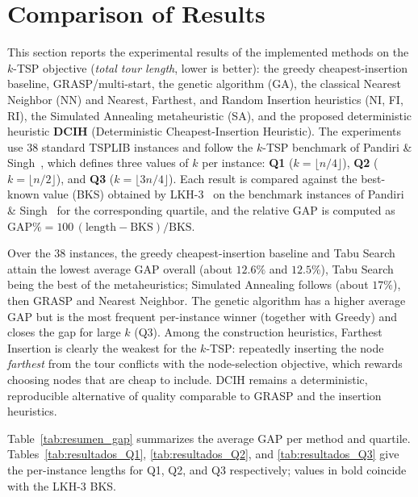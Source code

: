 \documentclass[conference]{IEEEtran}
\begin{document}
\section{Comparison of Results}
This section reports the experimental results of the implemented methods on the $k$-TSP objective (\emph{total tour length}, lower is better): the greedy cheapest-insertion baseline, GRASP/multi-start, the genetic algorithm (GA), the classical Nearest Neighbor (NN) and Nearest, Farthest, and Random Insertion heuristics (NI, FI, RI), the Simulated Annealing metaheuristic (SA), and the proposed deterministic heuristic \textbf{DCIH} (Deterministic Cheapest-Insertion Heuristic). The experiments use 38 standard TSPLIB instances and follow the $k$-TSP benchmark of Pandiri \& Singh~\cite{pandiri2020}, which defines three values of $k$ per instance: \textbf{Q1} ($k=\lfloor n/4\rfloor$), \textbf{Q2} ($k=\lfloor n/2\rfloor$), and \textbf{Q3} ($k=\lfloor 3n/4\rfloor$). Each result is compared against the best-known value (BKS) obtained by LKH-3~\cite{Helsgaun} on the benchmark instances of Pandiri \& Singh~\cite{pandiri2020} for the corresponding quartile, and the relative GAP is computed as $\mathrm{GAP}\%=100\,(\text{length}-\text{BKS})/\text{BKS}$.

Over the 38 instances, the greedy cheapest-insertion baseline and Tabu Search attain the lowest average GAP overall (about $12.6\%$ and $12.5\%$), Tabu Search being the best of the metaheuristics; Simulated Annealing follows (about $17\%$), then GRASP and Nearest Neighbor. The genetic algorithm has a higher average GAP but is the most frequent per-instance winner (together with Greedy) and closes the gap for large $k$ (Q3). Among the construction heuristics, Farthest Insertion is clearly the weakest for the $k$-TSP: repeatedly inserting the node \emph{farthest} from the tour conflicts with the node-selection objective, which rewards choosing nodes that are cheap to include. DCIH remains a deterministic, reproducible alternative of quality comparable to GRASP and the insertion heuristics.

Table~\ref{tab:resumen_gap} summarizes the average GAP per method and quartile. Tables~\ref{tab:resultados_Q1}, \ref{tab:resultados_Q2}, and \ref{tab:resultados_Q3} give the per-instance lengths for Q1, Q2, and Q3 respectively; values in bold coincide with the LKH-3 BKS.
\end{document}
